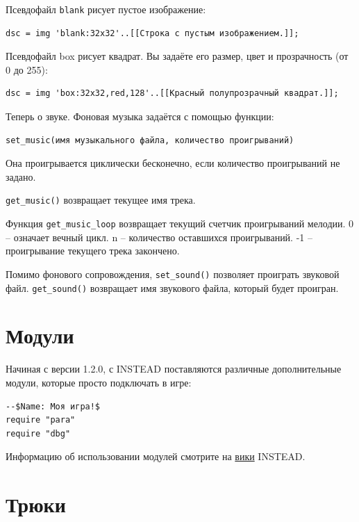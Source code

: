 \documentclass[12pt]{article}
\begin{document}
Псевдофайл \verb/blank/ рисует пустое изображение:

\begin{verbatim}
dsc = img 'blank:32x32'..[[Строка с пустым изображением.]];
\end{verbatim}

Псевдофайл box рисует квадрат. Вы задаёте его размер, цвет и прозрачность (от 0 до 255):

\begin{verbatim}
dsc = img 'box:32x32,red,128'..[[Красный полупрозрачный квадрат.]];
\end{verbatim}

Теперь о звуке. Фоновая музыка задаётся с помощью функции:

\begin{verbatim}
set_music(имя музыкального файла, количество проигрываний)
\end{verbatim}

Она проигрывается циклически бесконечно, если количество проигрываний не задано.

 \verb/get_music()/ возвращает текущее имя трека.

 Функция \verb/get_music_loop/ возвращает текущий счетчик проигрываний мелодии. 0 -- означает вечный цикл. n -- количество оставшихся проигрываний. -1 -- проигрывание текущего трека закончено.

Помимо фонового сопровождения, \verb/set_sound()/ позволяет проиграть звуковой файл. \verb/get_sound()/ возвращает имя звукового файла, который будет проигран.

\section{Модули}
Начиная с версии 1.2.0, с INSTEAD поставляются различные дополнительные модули, которые просто подключать в игре:

\begin{verbatim}
--$Name: Моя игра!$
require "para"
require "dbg"
\end{verbatim}

Информацию об использовании модулей смотрите на \href{http://instead.syscall.ru/wiki/ru/start}{вики} INSTEAD.

\section{Трюки}
\end{document}
